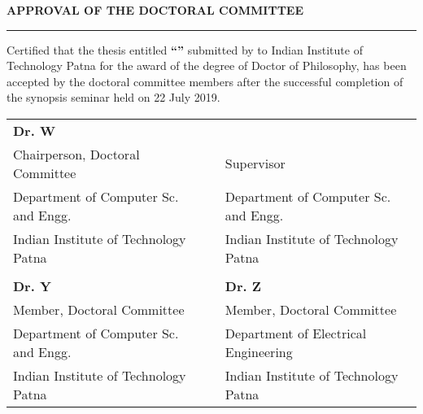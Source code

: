 \baselineskip
\centerline{\textbf{APPROVAL OF THE DOCTORAL COMMITTEE}}
\noindent\rule{16cm}{1pt}
\baselineskip



\noindent
Certified that the thesis entitled \textbf{\textquotedblleft \thesistitle\textquotedblright} submitted by \textbf{\authorname} to Indian Institute of Technology Patna for the award of the degree of Doctor of Philosophy, has been accepted by the doctoral committee members after the successful completion of the synopsis seminar held on 22 July 2019.


\vspace*{2.5cm}

\begin{table}[h]
\begin{tabular}{lp{2.1 cm}l}
\textbf{Dr. W}  						&   &  	\textbf{\supervisorname}  \\
Chairperson, Doctoral Committee  		&   &  	Supervisor \\
Department of Computer Sc. and Engg. 	&  	& 	Department of Computer Sc. and Engg.\\
Indian Institute of Technology Patna 	&   & 	Indian Institute of Technology Patna \\

\vspace*{1.5cm}\\

\textbf{Dr. Y} 							&  & \textbf{Dr. Z}    \\
Member, Doctoral Committee     			&  & Member, Doctoral Committee         \\
Department of Computer Sc. and Engg. 	&  & Department of Electrical Engineering   \\
Indian Institute of Technology Patna 	&  & Indian Institute of Technology Patna  \\
\end{tabular}
\end{table}

